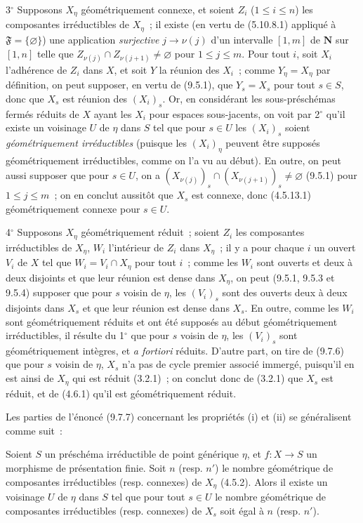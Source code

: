 3$^\circ$ Supposons $X_\eta$ géométriquement connexe, et soient $Z_i$
($1\leqslant i\leqslant n$) les composantes irréductibles de $X_\eta$~; il
existe (en vertu de (5.10.8.1) appliqué à $\mathfrak F=\{\varnothing\}$) une
application \emph{surjective} $j\to\nu(j)$ d'un intervalle $[1,m]$ de
$\mathbf N$ sur $[1,n]$ telle que
$Z_{\nu(j)}\cap Z_{\nu(j+1)}\neq\varnothing$ pour $1\leqslant j\leqslant m$.
Pour tout $i$, soit $X_i$ l'adhérence de $Z_i$ dans $X$, et soit $Y$ la réunion
des $X_i$~; comme $Y_\eta=X_\eta$ par définition, on peut supposer, en vertu de
(9.5.1), que $Y_s=X_s$ pour tout $s\in S$, donc que $X_s$ est réunion des
$(X_i)_s$. Or, en considérant les sous-préschémas fermés réduits de $X$ ayant
les $X_i$ pour espaces sous-jacents, on voit par 2$^\circ$ qu'il existe un
voisinage $U$ de $\eta$ dans $S$ tel que pour $s\in U$ les $(X_i)_s$ soient
\emph{géométriquement irréductibles} (puisque les $(X_i)_\eta$ peuvent être
supposés géométriquement irréductibles, comme on l'a vu au début). En outre, on
peut aussi supposer que pour $s\in U$, on a
$(X_{\nu(j)})_s\cap(X_{\nu(j+1)})_s\neq\varnothing$ (9.5.1) pour
$1\leqslant j\leqslant m$~; on en conclut aussitôt que $X_s$ est connexe, donc
(4.5.13.1) géométriquement connexe pour $s\in U$.

4$^\circ$ Supposons $X_\eta$ géométriquement réduit~; soient $Z_i$ les
composantes irréductibles de $X_\eta$, $W_i$ l'intérieur de $Z_i$ dans
$X_\eta$~; il y a pour chaque $i$ un ouvert $V_i$ de $X$ tel que
$W_i=V_i\cap X_\eta$ pour tout $i$~; comme les $W_i$ sont ouverts et deux à deux
disjoints et que leur réunion est dense dans $X_\eta$, on peut (9.5.1, 9.5.3 et
9.5.4) supposer que pour $s$ voisin de $\eta$, les $(V_i)_s$ sont des ouverts
deux à deux disjoints dans $X_s$ et que leur réunion est dense dans $X_s$. En
outre, comme les $W_i$ sont géométriquement réduits et ont été supposés au
début géométriquement irréductibles, il résulte du 1$^\circ$ que pour $s$ voisin
de $\eta$, les $(V_i)_s$ sont géométriquement intègres, et \emph{a fortiori}
réduits. D'autre part, on tire de (9.7.6) que pour $s$ voisin de $\eta$, $X_s$
n'a pas de cycle premier associé immergé, puisqu'il en est ainsi de $X_\eta$
qui est réduit (3.2.1)~; on conclut donc de (3.2.1) que $X_s$ est réduit, et de
(4.6.1) qu'il est géométriquement réduit.


Les parties de l'énoncé (9.7.7) concernant les propriétés (i) et (ii) se
généralisent comme suit~:

\begin{proposition}[9.7.8]
\label{IV.9.7.8-fr}
Soient $S$ un préschéma irréductible de point générique $\eta$, et $f:X\to S$
un morphisme de présentation finie. Soit $n$ \textup{(resp. $n'$)} le nombre géométrique
de composantes irréductibles \textup{(resp.} connexes\textup{)} de $X_\eta$ \textup{(4.5.2)}. Alors il
existe un voisinage $U$ de $\eta$ dans $S$ tel que pour tout $s\in U$ le nombre
géométrique de composantes irréductibles \textup{(resp.} connexes\textup{)} de $X_s$ soit égal à
$n$ \textup{(resp. $n'$)}.
\end{proposition}

